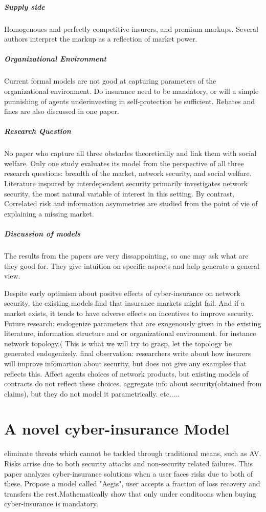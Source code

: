 \subparagraph{Supply side}
Homogenoues and perfectly competitive insurers, and premium markups.  Several authors interpret the markup as a reflection of market power. 
\subparagraph{Organizational Environment}
Current formal models are not good at capturing parameters of the organizational environment. Do insurance need to be mandatory, 
or will a simple punnishing of agents underinvesting in self-protection be sufficient. Rebates and fines are also discussed in one paper. 
\subparagraph{Research Question}
No paper who capture all three obstacles theoretically and link them with social welfare.
Only one study evaluates its model from the perspective of all three research questions: breadth of the market, 
network security, and social welfare. Literature inspured by interdependent security primarily investigates network security,
 the most natural variable of interest in this setting. 
 By contrast, Correlated risk and information asymmetries are studied from the point of vie of explaining a missing market.

\subparagraph{Discussion of models}
The results from the papers are very dissappointing, so one may ask what are they good for. They give intuition on specific aspects and help generate a general view. 


Despite early optimism about positve effects of cyber-insurance on network security, the existing models find that insurance markets might fail. And if a market exists, it tends to have adverse effects on incentives to improve security.
Future research: endogenize parameters that are exogenously given in the existing literature, information structure and or organizational environment. 
for instance network topology.( This is what we will try to grasp, let the topology be generated endogenizely. 
final observation: researchers write about how insurers will improve infomartion about security, but does not give any examples that reflects this. Affect agents choices of network products, but existing models of contracts do not reflect these choices. aggregate info about security(obtained from claims), but they do not model it parametrically. etc.....


\section{A novel cyber-insurance Model}
eliminate threats which cannot be tackled through traditional means, such as AV. Risks arrise due to both security attacks and non-security related failures. This paper analyzes cyber-insurance solutions when a user faces risks due to both of these. Propose a model called "Aegis", user accepts a fraction of loss recovery and transfers the rest.Mathematically show that only under conditoons when buying cyber-insurance  is mandatory.
